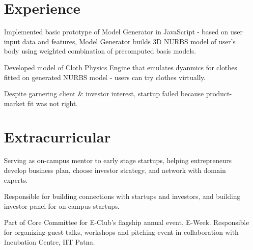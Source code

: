 \documentclass[]{deedy}
\begin{document}
\begin{flushleft}
\section{Experience}
\begin{tightemize}
\item 
\end{tightemize}
\sectionsep
%
\begin{tightemize}
\item Implemented basic prototype of Model Generator in JavaScript - based on user input data and features, Model Generator builds 3D NURBS model of user's body using weighted combination of precomputed basis models.
\item Developed model of Cloth Physics Engine that emulates dyanmics for clothes fitted on generated NURBS model - users can try clothes virtually.
\item Despite garnering client \& investor interest, startup failed because product-market fit was not right.
\end{tightemize}
\sectionsep

\section{Extracurricular}
\begin{tightemize}
\item Serving as on-campus mentor to early stage startups, helping entrepreneurs develop business plan, choose investor strategy, and network with domain experts.
\item Responsible for building connections with startups and investors, and building investor panel for on-campus startups.
\item Part of Core Committee for E-Club’s flagship annual event, E-Week. Responsible for organizing guest talks, workshops and pitching event in collaboration with Incubation Centre, IIT Patna.
\end{tightemize}
\sectionsep

\end{flushleft}
\end{document}
